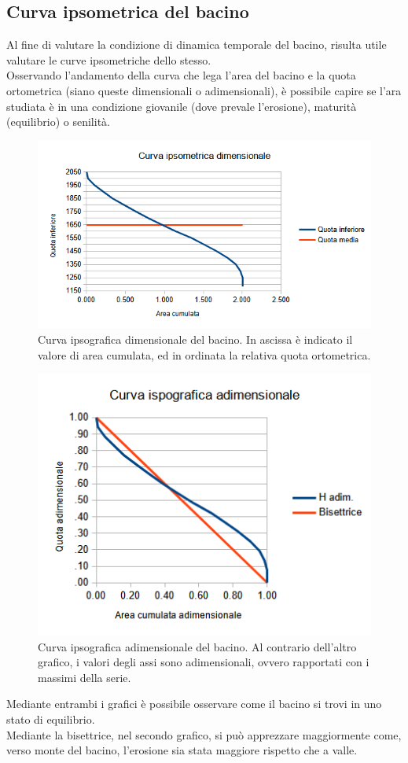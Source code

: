 \subsection{Curva ipsometrica del bacino}
Al fine di valutare la condizione di dinamica temporale del bacino, risulta utile valutare le curve ipsometriche dello stesso.\\
Osservando l'andamento della curva che lega l'area del bacino e la quota ortometrica (siano queste dimensionali o adimensionali), è possibile capire se l'ara studiata è in una condizione giovanile (dove prevale l'erosione), maturità (equilibrio) o senilità.
\begin{figure}[H] \centering
          \includegraphics[scale=0.7]{immagini/curva_ipsografica_dimens.png}
        \caption{Curva ipsografica dimensionale del bacino. In ascissa è indicato il valore di area cumulata, ed in ordinata la relativa quota ortometrica.}
\end{figure}    
\begin{figure}[H] \centering
        \includegraphics[scale=0.8]{immagini/curva_ipsografica_adimens.png}
        \caption{Curva ipsografica adimensionale del bacino. Al contrario dell'altro grafico, i valori degli assi sono adimensionali, ovvero rapportati con i massimi della serie.}
\end{figure}
Mediante entrambi i grafici è possibile osservare come il bacino si trovi in uno stato di equilibrio.\\
Mediante la bisettrice, nel secondo grafico, si può apprezzare maggiormente come, verso monte del bacino, l'erosione sia stata maggiore rispetto che a valle.

